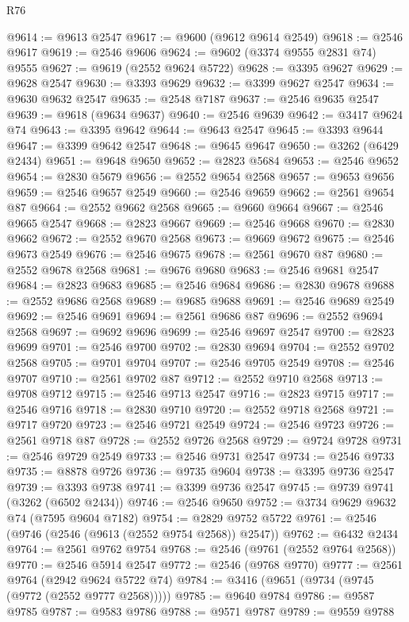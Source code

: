 \begin{lexlean}{R76}
\begin{coremodule}
@9614 := @9613 @2547
@9617 := @9600 (@9612 @9614 @2549)
@9618 := @2546 @9617
@9619 := @2546 @9606
@9624 := @9602 (@3374 @9555 @2831 @74) @9555
@9627 := @9619 (@2552 @9624 @5722)
@9628 := @3395 @9627
@9629 := @9628 @2547
@9630 := @3393 @9629
@9632 := @3399 @9627 @2547
@9634 := @9630 @9632 @2547
@9635 := @2548 @7187
@9637 := @2546 @9635 @2547
@9639 := @9618 (@9634 @9637)
@9640 := @2546 @9639
@9642 := @3417 @9624 @74
@9643 := @3395 @9642
@9644 := @9643 @2547
@9645 := @3393 @9644
@9647 := @3399 @9642 @2547
@9648 := @9645 @9647
@9650 := @3262 (@6429 @2434)
@9651 := @9648 @9650
@9652 := @2823 @5684
@9653 := @2546 @9652
@9654 := @2830 @5679
@9656 := @2552 @9654 @2568
@9657 := @9653 @9656
@9659 := @2546 @9657 @2549
@9660 := @2546 @9659
@9662 := @2561 @9654 @87
@9664 := @2552 @9662 @2568
@9665 := @9660 @9664
@9667 := @2546 @9665 @2547
@9668 := @2823 @9667
@9669 := @2546 @9668
@9670 := @2830 @9662
@9672 := @2552 @9670 @2568
@9673 := @9669 @9672
@9675 := @2546 @9673 @2549
@9676 := @2546 @9675
@9678 := @2561 @9670 @87
@9680 := @2552 @9678 @2568
@9681 := @9676 @9680
@9683 := @2546 @9681 @2547
@9684 := @2823 @9683
@9685 := @2546 @9684
@9686 := @2830 @9678
@9688 := @2552 @9686 @2568
@9689 := @9685 @9688
@9691 := @2546 @9689 @2549
@9692 := @2546 @9691
@9694 := @2561 @9686 @87
@9696 := @2552 @9694 @2568
@9697 := @9692 @9696
@9699 := @2546 @9697 @2547
@9700 := @2823 @9699
@9701 := @2546 @9700
@9702 := @2830 @9694
@9704 := @2552 @9702 @2568
@9705 := @9701 @9704
@9707 := @2546 @9705 @2549
@9708 := @2546 @9707
@9710 := @2561 @9702 @87
@9712 := @2552 @9710 @2568
@9713 := @9708 @9712
@9715 := @2546 @9713 @2547
@9716 := @2823 @9715
@9717 := @2546 @9716
@9718 := @2830 @9710
@9720 := @2552 @9718 @2568
@9721 := @9717 @9720
@9723 := @2546 @9721 @2549
@9724 := @2546 @9723
@9726 := @2561 @9718 @87
@9728 := @2552 @9726 @2568
@9729 := @9724 @9728
@9731 := @2546 @9729 @2549
@9733 := @2546 @9731 @2547
@9734 := @2546 @9733
@9735 := @8878 @9726
@9736 := @9735 @9604
@9738 := @3395 @9736 @2547
@9739 := @3393 @9738
@9741 := @3399 @9736 @2547
@9745 := @9739 @9741 (@3262 (@6502 @2434))
@9746 := @2546 @9650
@9752 := @3734 @9629 @9632 @74 (@7595 @9604 @7182)
@9754 := @2829 @9752 @5722
@9761 := @2546 (@9746 (@2546 (@9613 (@2552 @9754 @2568)) @2547))
@9762 := @6432 @2434
@9764 := @2561 @9762 @9754
@9768 := @2546 (@9761 (@2552 @9764 @2568))
@9770 := @2546 @5914 @2547
@9772 := @2546 (@9768 @9770)
@9777 := @2561 @9764 (@2942 @9624 @5722 @74)
@9784 := @3416 (@9651 (@9734 (@9745 (@9772 (@2552 @9777 @2568)))))
@9785 := @9640 @9784
@9786 := @9587 @9785
@9787 := @9583 @9786
@9788 := @9571 @9787
@9789 := @9559 @9788

\end{coremodule}
\end{lexlean}
